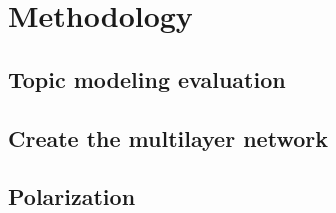 \chapter{Methodology}%

\section{Topic modeling evaluation}
\section{Create the multilayer network}
\section{Polarization}